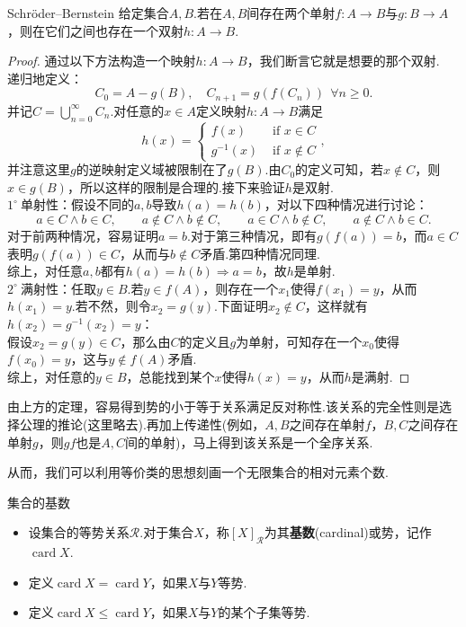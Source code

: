 \documentclass[lang=cn, zihao=5]{elegantbook}
\newcommand{\buzhou}[1]{$#1^{\circ} \ $}
\DeclareMathOperator{\card}{card}
\begin{document}
\begin{theorem}{Schröder–Bernstein}
	给定集合$A,B$.若在$A,B$间存在两个单射$f:A \to B$与$g:B \to A$，则在它们之间也存在一个双射$h:A \to B$.
\end{theorem}
\begin{proof}
	通过以下方法构造一个映射$h:A \to B$，我们断言它就是想要的那个双射. \\
	递归地定义：$$C_0 = A - g(B),\quad C_{n+1}=g(f(C_n))~~\forall n \geq 0.$$
	并记$C = \bigcup_{n=0}^{\infty} C_n$.对任意的$x \in A$定义映射$h: A\to B$满足$$h(x) = \begin{cases}
 f(x) & \text{ if } x \in C \\
 g^{-1}(x) & \text{ if } x \notin C
\end{cases},$$并注意这里$g$的逆映射定义域被限制在了$g(B)$.由$C_0$的定义可知，若$x \notin C$，则$x \in g(B)$，所以这样的限制是合理的.接下来验证$h$是双射. \\
\buzhou{1}单射性：假设不同的$a,b$导致$h(a)=h(b)$，对以下四种情况进行讨论：$$a \in C \wedge b \in C,\qquad a \notin C \wedge b \notin C,\qquad a \in C \wedge b \notin C,\qquad a \notin C \wedge b \in C.$$
对于前两种情况，容易证明$a=b$.对于第三种情况，即有$g(f(a))=b$，而$a \in C$表明$g(f(a)) \in C$，从而与$b \notin C$矛盾.第四种情况同理. \\
综上，对任意$a,b$都有$h(a)=h(b) \Rightarrow a=b$，故$h$是单射. \\
\buzhou{2}满射性：任取$y \in B$.若$y \in f(A)$，则存在一个$x_1$使得$f(x_1)=y$，从而$h(x_1)=y$.若不然，则令$x_2=g(y)$.下面证明$x_2 \notin C$，这样就有$h(x_2)=g^{-1}(x_2)=y$： \\
假设$x_2=g(y) \in C$，那么由$C$的定义且$g$为单射，可知存在一个$x_0$使得$f(x_0)=y$，这与$y \notin f(A)$矛盾. \\
综上，对任意的$y \in B$，总能找到某个$x$使得$h(x)=y$，从而$h$是满射.
\end{proof}

由上方的定理，容易得到势的小于等于关系满足反对称性.该关系的完全性则是选择公理的推论(这里略去).再加上传递性(例如，$A,B$之间存在单射$f$，$B,C$之间存在单射$g$，则$gf$也是$A,C$间的单射)，马上得到该关系是一个全序关系.

从而，我们可以利用等价类的思想刻画一个无限集合的相对元素个数.

\begin{definition}{集合的基数}
	\begin{itemize}
		\item 设集合的等势关系$\mathcal{R}$.对于集合$X$，称$[X]_{\mathcal{R}}$为其\textbf{基数}(cardinal)或势，记作$\card X$.
		\item 定义$\card X = \card Y$，如果$X$与$Y$等势.
		\item 定义$\card X \leq \card Y$，如果$X$与$Y$的某个子集等势.
	\end{itemize}
\end{definition}
\end{document}
